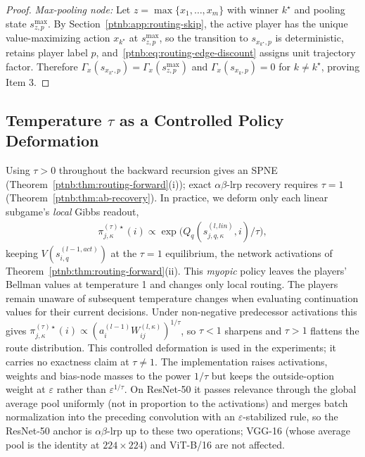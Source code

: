 \begin{proof}
\emph{Max-pooling node:} Let $z = \max\{x_1,\dots,x_m\}$ with winner $k^\star$ and pooling state
$s_{z,p}^{\max}$. By Section~\ref{ptnb:app:routing-skip}, the active player has the unique
value-maximizing action $x_{k^\star}$ at $s_{z,p}^{\max}$, so the transition to $s_{x_{k^\star},p}$
is deterministic, retains player label $p$, and~\eqref{ptnb:eq:routing-edge-discount} assigns unit
trajectory factor. Therefore $\Gamma_x(s_{x_{k^\star},p}) = \Gamma_x(s_{z,p}^{\max})$ and
$\Gamma_x(s_{x_k,p}) = 0$ for $k \neq k^\star$, proving Item 3.
\end{proof}

\subsection{Temperature \texorpdfstring{$\tau$}{tau} as a Controlled Policy Deformation}\label{ptnb:app:routing-temp}

Using $\tau>0$ throughout the backward recursion gives an SPNE
(Theorem~\ref{ptnb:thm:routing-forward}(i)); exact $\alpha\beta$-\ac{lrp} recovery requires
$\tau=1$ (Theorem~\ref{ptnb:thm:ab-recovery}). In practice, we deform only each linear subgame's
\emph{local} Gibbs readout,
\begin{align}\label{ptnb:eq:routing-gibbs-general-tau}
    \pi_{j,\kappa}^{(\tau)\star}(i) \propto \exp\!\bigl(Q_q(s_{j,q,\kappa}^{(l, lin)}, i)/\tau\bigr),
\end{align}
keeping $V(s_{i,q}^{(l-1,act)})$ at the $\tau=1$ equilibrium, the network activations of
Theorem~\ref{ptnb:thm:routing-forward}(ii). This \emph{myopic} policy leaves the players' Bellman
values at temperature 1 and changes only local routing. The players remain unaware of subsequent
temperature changes when evaluating continuation values for their current decisions. Under non-negative predecessor activations this gives
$\pi_{j,\kappa}^{(\tau)\star}(i) \propto (a_i^{(l-1)} W_{ij}^{(l,\kappa)})^{1/\tau}$, so $\tau<1$
sharpens and $\tau>1$ flattens the route distribution. This controlled deformation is used in the
experiments; it carries no exactness claim at $\tau \neq 1$. The implementation raises activations,
weights and bias-node masses to the power $1/\tau$ but keeps the outside-option weight at
$\varepsilon$ rather than $\varepsilon^{1/\tau}$. On ResNet-50 it passes relevance through the
global average pool uniformly (not in proportion to the activations) and merges batch normalization
into the preceding convolution with an $\varepsilon$-stabilized rule, so the ResNet-50 anchor is
$\alpha\beta$-\ac{lrp} up to these two operations; VGG-16 (whose average pool is the identity at
$224{\times}224$) and ViT-B/16 are not affected.
\par\medskip

